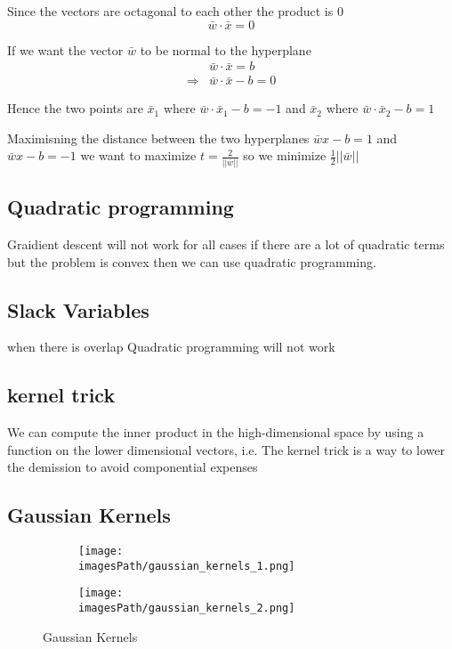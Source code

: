 \documentclass{article}
\newcommand{\imagesPath}{images}
\begin{document}
Since the vectors are octagonal to each other the product is 0
\begin{equation*}
    \bar{w}\cdot\bar{x} = 0
\end{equation*}

If we want the vector $\bar{w}$ to be normal to the hyperplane
\begin{align*}
    &\bar{w}\cdot\bar{x} = b \\
    \Rightarrow &\bar{w}\cdot\bar{x} - b = 0
\end{align*}

Hence the two points are $\bar{x}_1$ where $\bar{w}\cdot\bar{x}_1 -b = -1$ and 
$\bar{x}_2$ where $\bar{w}\cdot\bar{x}_2 -b = 1$

Maximisning the distance between the two hyperplanes $\bar{w}x-b=1$ and $\bar{w}x-b=-1$
we want to maximize $t=\frac{2}{||\bar{w}||}$ so we minimize $\frac{1}{2}||\bar{w}||$

\newpage
\subsection{Quadratic programming}
Graidient descent will not work for all cases if there are a lot of quadratic terms but 
the problem is convex then we can use quadratic programming.

\subsection{Slack Variables}
when there is overlap Quadratic programming will not work

\subsection{kernel trick}
We can compute the inner product in the high-dimensional space by
using a function on the lower dimensional vectors,
i.e. The kernel trick is a way to lower the demission to avoid componential expenses

\subsection{Gaussian Kernels}
\begin{figure}
     \centering
     \begin{subfigure}[b]{0.4\textwidth}
         \centering
         \texttt{[image: \\imagesPath/gaussian\_kernels\_1.png]}
     \end{subfigure}
     \hfill
     \begin{subfigure}[b]{0.4\textwidth}
         \centering
         \texttt{[image: \\imagesPath/gaussian\_kernels\_2.png]}
     \end{subfigure}
        \caption{Gaussian Kernels}
\end{figure}
\end{document}
